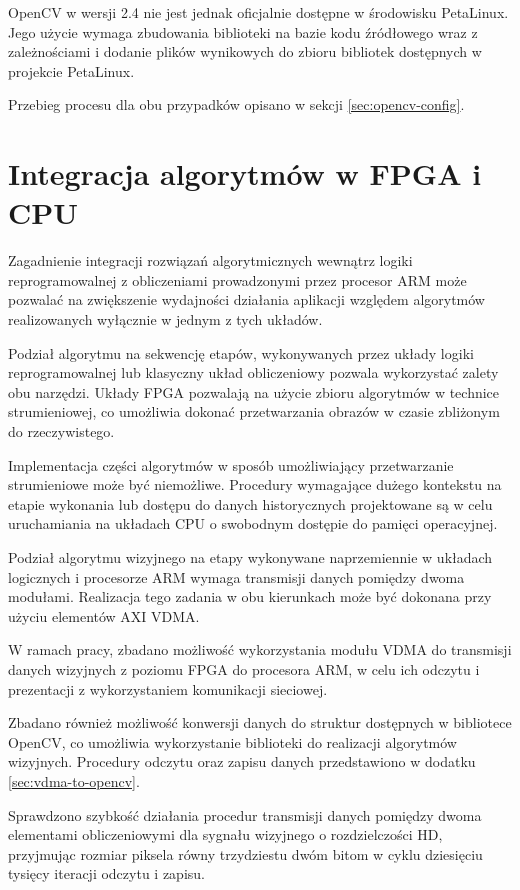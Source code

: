OpenCV w wersji 2.4 nie jest jednak oficjalnie dostępne w środowisku PetaLinux. Jego użycie wymaga zbudowania biblioteki na bazie kodu źródłowego wraz z zależnościami i dodanie plików wynikowych do zbioru bibliotek dostępnych w projekcie PetaLinux.

Przebieg procesu dla obu przypadków opisano w sekcji \ref{sec:opencv-config}.

\section{Integracja algorytmów w FPGA i CPU}
Zagadnienie integracji rozwiązań algorytmicznych wewnątrz logiki reprogramowalnej z obliczeniami prowadzonymi przez procesor ARM może pozwalać na zwiększenie wydajności działania aplikacji względem algorytmów realizowanych wyłącznie w jednym z tych układów.

Podział algorytmu na sekwencję etapów, wykonywanych przez układy logiki reprogramowalnej lub klasyczny układ obliczeniowy pozwala wykorzystać zalety obu narzędzi. Układy FPGA pozwalają na użycie zbioru algorytmów w technice strumieniowej, co umożliwia dokonać przetwarzania obrazów w czasie zbliżonym do rzeczywistego. 

Implementacja części algorytmów w sposób umożliwiający przetwarzanie strumieniowe może być niemożliwe. Procedury wymagające dużego kontekstu na etapie wykonania lub dostępu do danych historycznych projektowane są w celu uruchamiania na układach CPU o swobodnym dostępie do pamięci operacyjnej.

Podział algorytmu wizyjnego na etapy wykonywane naprzemiennie w układach logicznych i procesorze ARM wymaga transmisji danych pomiędzy dwoma modułami. Realizacja tego zadania w obu kierunkach może być dokonana przy użyciu elementów AXI VDMA.

W ramach pracy, zbadano możliwość wykorzystania modułu VDMA do transmisji danych wizyjnych z poziomu FPGA do procesora ARM, w celu ich odczytu i prezentacji z wykorzystaniem komunikacji sieciowej.

Zbadano również możliwość konwersji danych do struktur dostępnych w bibliotece OpenCV, co umożliwia wykorzystanie biblioteki do realizacji algorytmów wizyjnych. Procedury odczytu oraz zapisu danych przedstawiono w dodatku \ref{sec:vdma-to-opencv}.

Sprawdzono szybkość działania procedur transmisji danych pomiędzy dwoma elementami obliczeniowymi dla sygnału wizyjnego o rozdzielczości HD, przyjmując rozmiar piksela równy trzydziestu dwóm bitom w cyklu dziesięciu tysięcy iteracji odczytu i zapisu.

